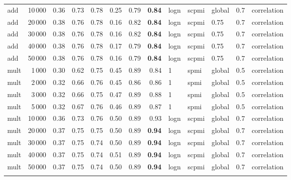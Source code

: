 \begin{tabular}{lrrrrrrrlllll}
     add &           10\,000 &       0.36 &  0.73 &  0.78 &  0.25 &       0.79 &       \textbf{0.84} &  logn &  scpmi &  global &  0.7 &    correlation \\
     add &           20\,000 &       0.38 &  0.76 &  0.78 &  0.16 &       0.82 &       \textbf{0.84} &  logn &  scpmi &    0.75 &  0.7 &    correlation \\
     add &           30\,000 &       0.38 &  0.76 &  0.78 &  0.16 &       0.82 &       \textbf{0.84} &  logn &  scpmi &    0.75 &  0.7 &    correlation \\
     add &           40\,000 &       0.38 &  0.76 &  0.78 &  0.17 &       0.79 &       \textbf{0.84} &  logn &  scpmi &    0.75 &  0.7 &    correlation \\
     add &           50\,000 &       0.38 &  0.76 &  0.78 &  0.16 &       0.79 &       \textbf{0.84} &  logn &  scpmi &    0.75 &  0.7 &    correlation \\ \addlinespace
    mult &            1\,000 &       0.30 &  0.62 &  0.75 &  0.45 &       0.89 &       0.84 &     1 &   spmi &  global &  0.5 &    correlation \\
    mult &            2\,000 &       0.32 &  0.66 &  0.76 &  0.45 &       0.86 &       0.86 &     1 &   spmi &  global &  0.5 &    correlation \\
    mult &            3\,000 &       0.32 &  0.66 &  0.75 &  0.47 &       0.89 &       0.88 &     1 &   spmi &  global &  0.5 &    correlation \\
    mult &            5\,000 &       0.32 &  0.67 &  0.76 &  0.46 &       0.89 &       0.87 &     1 &   spmi &  global &  0.5 &    correlation \\
    mult &           10\,000 &       0.36 &  0.73 &  0.76 &  0.50 &       0.89 &       0.93 &  logn &  scpmi &  global &  0.7 &    correlation \\
    mult &           20\,000 &       0.37 &  0.75 &  0.75 &  0.50 &       0.89 &       \textbf{0.94} &  logn &  scpmi &  global &  0.7 &    correlation \\
    mult &           30\,000 &       0.37 &  0.75 &  0.74 &  0.50 &       0.89 &       \textbf{0.94} &  logn &  scpmi &  global &  0.7 &    correlation \\
    mult &           40\,000 &       0.37 &  0.75 &  0.74 &  0.51 &       0.89 &       \textbf{0.94} &  logn &  scpmi &  global &  0.7 &    correlation \\
    mult &           50\,000 &       0.37 &  0.75 &  0.74 &  0.50 &       0.89 &       \textbf{0.94} &  logn &  scpmi &  global &  0.7 &    correlation \\ \addlinespace

\end{tabular}
